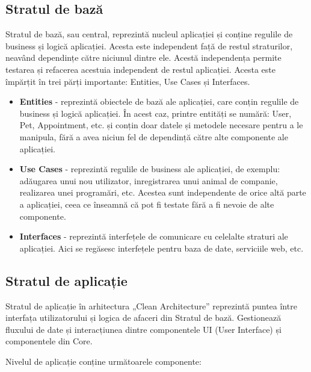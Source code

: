 \newpage

\subsection{Stratul de bază}

Stratul de bază, sau central, reprezintă nucleul aplicației și conține regulile de business și logică aplicației. Acesta este independent față de restul straturilor, neavând dependințe către niciunul dintre ele. Acestă independența permite testarea și refacerea acestuia independent de restul aplicației. Acesta este împărțit în trei părți importante: Entities, Use Cases și Interfaces.

\begin{itemize}
    \item \textbf{Entities} - reprezintă obiectele de bază ale aplicației, care conțin regulile de business și logică aplicației. În acest caz, printre entități se numără: User, Pet, Appointment, etc. și conțin doar datele și metodele necesare pentru a le manipula, fără a avea niciun fel de dependință către alte componente ale aplicației.
    \item \textbf{Use Cases} - reprezintă regulile de business ale aplicației, de exemplu: adăugarea unui nou utilizator, inregistrarea unui animal de companie, realizarea unei programări, etc. Acestea sunt independente de orice altă parte a aplicației, ceea ce înseamnă că pot fi testate fără a fi nevoie de alte componente. 
    \item \textbf{Interfaces} - reprezintă interfețele de comunicare cu celelalte straturi ale aplicației. Aici se regăsesc interfețele pentru baza de date, serviciile web, etc.
    
\end{itemize}

\subsection{Stratul de aplicație}

Stratul de aplicație în arhitectura „Clean Architecture” reprezintă puntea între interfața utilizatorului și logica de afaceri din Stratul de bază. Gestionează fluxului de date și interacțiunea dintre componentele UI (User Interface) și componentele din Core. 

Nivelul de aplicație conține următoarele componente: 

